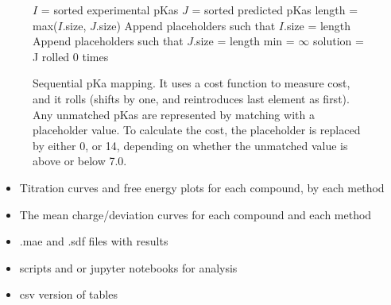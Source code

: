 \documentclass[9pt,lineno]{elife}
\begin{document}
\begin{figure}
\begin{algorithm}[H]
\SetAlgoLined
 \caption{Sequential pKa mapping. It uses a cost function to measure cost, and it rolls (shifts by one, and reintroduces last element as first). Any unmatched pKas are represented by matching with a placeholder value. To calculate the cost, the placeholder is replaced by either 0, or 14, depending on whether the unmatched value is above or below 7.0.}
 \label{alg:sequential}
 
 $I$ = sorted experimental pKas \;
 $J$ = sorted predicted pKas \;
 length = max($I$.size, $J$.size)\;
 Append placeholders such that $I$.size = length \;
 Append placeholders such that $J$.size = length \;
 min = $\infty$\;
 solution = J rolled 0 times\;
\end{algorithm}
\end{figure}

\begin{itemize}
    \item Titration curves and free energy plots for each compound, by each method
    \item The mean charge/deviation curves for each compound and each method
    \item .mae and .sdf files with results
    \item scripts and or jupyter notebooks for analysis
    \item csv version of tables
\end{itemize}
\end{document}
